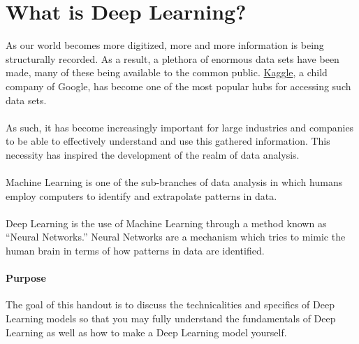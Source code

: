 \documentclass{article}
\begin{document}
\section{What is Deep Learning?}
As our world becomes more digitized, more and more information is being structurally recorded. As a result, a plethora of enormous data sets have been made, many of these being available to the common public. \color{blue}\href{https://www.kaggle.com/}{Kaggle}\color{black}, a child company of Google, has become one of the most popular hubs for accessing such data sets. 
\\
\\
As such, it has become increasingly important for large industries and companies to be able to effectively understand and use this gathered information. This necessity has inspired the development of the realm of data analysis. 
\\
\\
Machine Learning is one of the sub-branches of data analysis in which humans employ computers to identify and extrapolate patterns in data. 
\\
\\
Deep Learning is the use of Machine Learning through a method known as ``Neural Networks.'' Neural Networks are a mechanism which tries to mimic the human brain in terms of how patterns in data are identified. 

\paragraph{Purpose}The goal of this handout is to discuss the technicalities and specifics of Deep Learning models so that you may fully understand the fundamentals of Deep Learning as well as how to make a Deep Learning model yourself.
\end{document}
